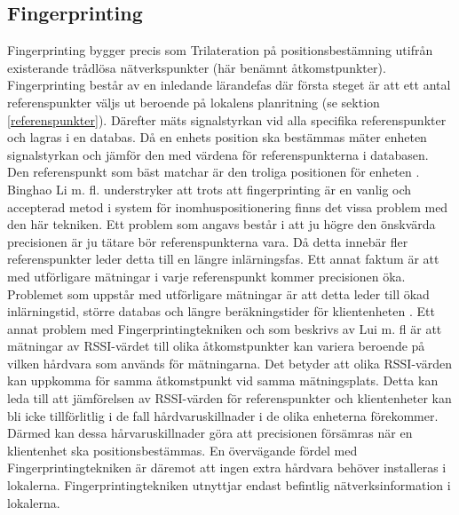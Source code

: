 \documentclass[a4paper,12pt]{article}
\begin{document}
 \subsection{Fingerprinting}\label{fingerprinting}
 Fingerprinting bygger precis som Trilateration på positionsbestämning utifrån existerande trådlösa nätverkspunkter (här benämnt åtkomstpunkter). Fingerprinting består av en inledande lärandefas där första steget är att ett antal referenspunkter väljs ut beroende på lokalens planritning (se sektion \ref{referenspunkter}). Därefter mäts signalstyrkan vid alla specifika referenspunkter och lagras i en databas.
 Då en enhets position ska bestämmas mäter enheten signalstyrkan och jämför den med värdena för referenspunkterna i databasen. Den referenspunkt som bäst matchar är den troliga positionen för enheten \cite{IP1}\cite{jun2018low}.
 Binghao Li m. fl. understryker att trots att fingerprinting är en vanlig och accepterad metod i system för inomhuspositionering finns det vissa problem med den här tekniken\cite{IP1}.
 Ett problem som angavs består i att ju högre den önskvärda precisionen är ju tätare bör referenspunkterna vara. Då detta innebär fler referenspunkter leder detta till en längre inlärningsfas. Ett annat faktum är att med utförligare mätningar i varje referenspunkt kommer precisionen öka. Problemet som uppstår med utförligare mätningar är att detta leder till ökad inlärningstid, större databas och längre beräkningstider för klientenheten \cite{IP1}. Ett annat problem med Fingerprintingtekniken och som beskrivs av Lui m. fl \cite{problem_with_RSSI} är att mätningar av RSSI-värdet till olika åtkomstpunkter kan variera beroende på vilken hårdvara som används för mätningarna. Det betyder att olika RSSI-värden kan uppkomma för samma åtkomstpunkt vid samma mätningsplats. Detta kan leda till att jämförelsen av RSSI-värden för referenspunkter och klientenheter kan bli icke tillförlitlig i de fall hårdvaruskillnader i de olika enheterna förekommer. Därmed kan dessa hårvaruskillnader göra att precisionen försämras när en klientenhet ska positionsbestämmas\cite{problem_with_RSSI}. En övervägande fördel med Fingerprintingtekniken är däremot att ingen extra hårdvara behöver installeras i lokalerna. Fingerprintingtekniken utnyttjar endast befintlig nätverksinformation i lokalerna.
\end{document}
